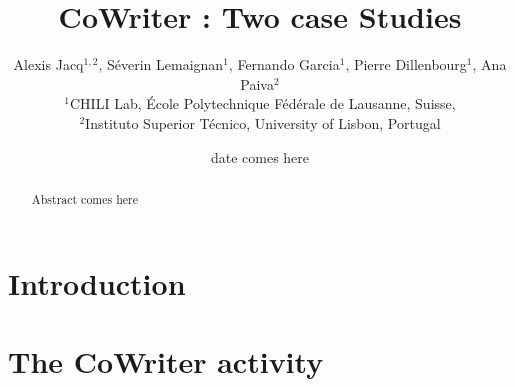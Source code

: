 \documentclass{sig-alternate}
\begin{document}

\title{CoWriter : Two case Studies}


\author{Alexis Jacq$^{1,2}$, S\'everin Lemaignan$^1$, Fernando Garcia$^1$, Pierre Dillenbourg$^1$, Ana Paiva$^2$\\
$^1$CHILI Lab, \'Ecole Polytechnique F\'ed\'erale de Lausanne, Suisse,\\
$^2$Instituto Superior T\'{e}cnico, University of Lisbon, Portugal}


%
%


\date{date comes here}


\maketitle
\begin{abstract}
Abstract comes here
\end{abstract}


\section{Introduction}


\section{The CoWriter activity}
\end{document}
